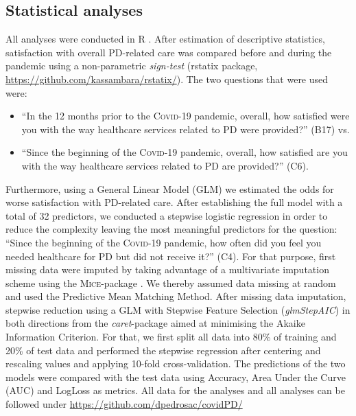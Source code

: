 \documentclass[a4paper,oneside,11pt,english]{scrartcl}
\begin{document}
\subsection*{Statistical analyses}
All analyses were conducted in R \cite{rcore}. After estimation of descriptive statistics, satisfaction with overall \textsc{PD}-related care was compared before and during the pandemic using a non-parametric \textit{sign-test} (rstatix package, \url{https://github.com/kassambara/rstatix/}). The two questions that were used were: 
\begin{itemize}
\item ``In the 12 months prior to the  \textsc{Covid}-19 pandemic, overall, how satisfied were you with the way healthcare services related to \textsc{PD} were provided?'' (B17) vs.
\item ``Since the beginning of the \textsc{Covid}-19 pandemic, overall, how satisfied are you with the way healthcare services related to \textsc{PD} are provided?'' (C6).
\end{itemize}

Furthermore, using a General Linear Model (\textsc{GLM}) we estimated the odds for worse satisfaction with \textsc{PD}-related care. After establishing the full model with a total of 32 predictors, we conducted a stepwise logistic regression in order to reduce the complexity leaving the most meaningful predictors for the question: ``Since the beginning of the \textsc{Covid}-19 pandemic, how often did you feel you needed healthcare for \textsc{PD} but did not receive it?'' (C4). For that purpose, first missing data were imputed by taking advantage of a multivariate imputation scheme using the \textsc{Mice}-package \cite{vanbuuren2011}. We thereby assumed data missing at random and used the Predictive Mean Matching Method. After missing data imputation, stepwise reduction using a \textsc{GLM} with Stepwise Feature Selection (\textit{glmStepAIC}) in both directions from the \textit{caret}-package \cite{kuhn2008} aimed at minimising the Akaike Information Criterion. For that, we first split all data into 80\% of training and 20\% of test data and performed the stepwise regression after centering and rescaling values and applying 10-fold cross-validation. The predictions of the two models were compared with the test data using Accuracy, Area Under the Curve (AUC) and LogLoss as metrics. All data for the analyses and all analyses can be followed under \url{https://github.com/dpedrosac/covidPD/}

\newpage
\end{document}
